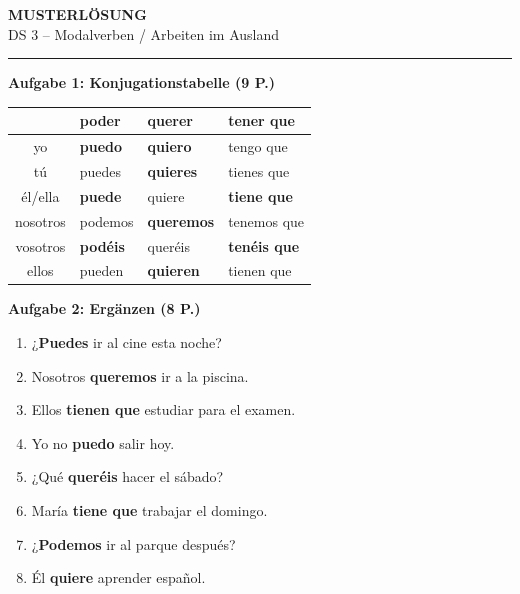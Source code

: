 \documentclass[11pt,a4paper]{article}
\newcommand{\lsg}[1]{\textcolor{loesung}{\textbf{#1}}}
\begin{document}
\begin{center}
{\Large\textbf{\textcolor{loesung}{MUSTERLÖSUNG}}}\\[0.3em]
{\large DS 3 -- Modalverben / Arbeiten im Ausland}
\end{center}

\vspace{0.5em}
\hrule
\vspace{1em}

\begin{gruppenbox}

\textbf{Aufgabe 1: Konjugationstabelle (9 P.)}

\begin{tabularx}{\textwidth}{@{}|c|l|l|l|@{}}
\hline
& \textbf{poder} & \textbf{querer} & \textbf{tener que} \\
\hline
yo & \lsg{puedo} & \lsg{quiero} & tengo que \\
\hline
tú & puedes & \lsg{quieres} & tienes que \\
\hline
él/ella & \lsg{puede} & quiere & \lsg{tiene que} \\
\hline
nosotros & podemos & \lsg{queremos} & tenemos que \\
\hline
vosotros & \lsg{podéis} & queréis & \lsg{tenéis que} \\
\hline
ellos & pueden & \lsg{quieren} & tienen que \\
\hline
\end{tabularx}

\vspace{0.5em}

\textbf{Aufgabe 2: Ergänzen (8 P.)}
\begin{enumerate}[label=\alph*), leftmargin=2em, nosep]
    \item ¿\lsg{Puedes} ir al cine esta noche?
    \item Nosotros \lsg{queremos} ir a la piscina.
    \item Ellos \lsg{tienen que} estudiar para el examen.
    \item Yo no \lsg{puedo} salir hoy.
    \item ¿Qué \lsg{queréis} hacer el sábado?
    \item María \lsg{tiene que} trabajar el domingo.
    \item ¿\lsg{Podemos} ir al parque después?
    \item Él \lsg{quiere} aprender español.
\end{enumerate}


\end{gruppenbox}
\end{document}
